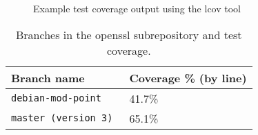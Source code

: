 \documentclass[conference]{IEEEtran}
\begin{document}
\begin{figure*}[!t]
  \noindent{}
  \caption{Example test coverage output using the lcov tool}
  \label{coveragedemo}  
\end{figure*}

\begin{table*}[!t]
  \centering
  \begin{tabular}{|l|l|}
    \hline
    Branch name & Coverage \%  (by line)\\ \hline
    \verb|debian-mod-point| & 41.7\% \\ \hline
    \verb|master (version 3) | & 65.1\% \\ \hline
  \end{tabular}
  \caption{Branches in the openssl subrepository and test coverage.}
  \label{branches-coverage}
\end{table*}
\end{document}
